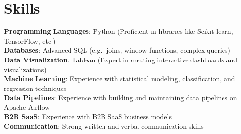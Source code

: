 \section{Skills}
  \begin{itemize}[leftmargin=0.1in, label={}]
    \normalsize{\item{
      \textbf{Programming Languages}: Python (Proficient in libraries like Scikit-learn, TensorFlow, etc.) \\
      \textbf{Databases}: Advanced SQL (e.g., joins, window functions, complex queries) \\
      \textbf{Data Visualization}: Tableau (Expert in creating interactive dashboards and visualizations) \\
      \textbf{Machine Learning}: Experience with statistical modeling, classification, and regression techniques \\
      \textbf{Data Pipelines}: Experience with building and maintaining data pipelines on Apache-Airflow \\
      \textbf{B2B SaaS}: Experience with B2B SaaS business models \\
      \textbf{Communication}: Strong written and verbal communication skills \\
     }}
  \end{itemize}
\vspace{-10pt}
